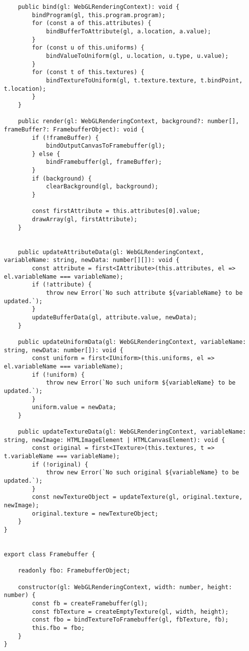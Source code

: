 {\begin{lstlisting}
    public bind(gl: WebGLRenderingContext): void {
        bindProgram(gl, this.program.program);
        for (const a of this.attributes) {
            bindBufferToAttribute(gl, a.location, a.value);
        }
        for (const u of this.uniforms) {
            bindValueToUniform(gl, u.location, u.type, u.value);
        }
        for (const t of this.textures) {
            bindTextureToUniform(gl, t.texture.texture, t.bindPoint, t.location);
        }
    }

    public render(gl: WebGLRenderingContext, background?: number[], frameBuffer?: FramebufferObject): void {
        if (!frameBuffer) {
            bindOutputCanvasToFramebuffer(gl);
        } else {
            bindFramebuffer(gl, frameBuffer);
        }
        if (background) {
            clearBackground(gl, background);
        }

        const firstAttribute = this.attributes[0].value;
        drawArray(gl, firstAttribute);
    }


    public updateAttributeData(gl: WebGLRenderingContext, variableName: string, newData: number[][]): void {
        const attribute = first<IAttribute>(this.attributes, el => el.variableName === variableName);
        if (!attribute) {
            throw new Error(`No such attribute ${variableName} to be updated.`);
        }
        updateBufferData(gl, attribute.value, newData);
    }

    public updateUniformData(gl: WebGLRenderingContext, variableName: string, newData: number[]): void {
        const uniform = first<IUniform>(this.uniforms, el => el.variableName === variableName);
        if (!uniform) {
            throw new Error(`No such uniform ${variableName} to be updated.`);
        }
        uniform.value = newData;
    }

    public updateTextureData(gl: WebGLRenderingContext, variableName: string, newImage: HTMLImageElement | HTMLCanvasElement): void {
        const original = first<ITexture>(this.textures, t => t.variableName === variableName);
        if (!original) {
            throw new Error(`No such original ${variableName} to be updated.`);
        }
        const newTextureObject = updateTexture(gl, original.texture, newImage);
        original.texture = newTextureObject;
    }
}


export class Framebuffer {

    readonly fbo: FramebufferObject;

    constructor(gl: WebGLRenderingContext, width: number, height: number) {
        const fb = createFramebuffer(gl);
        const fbTexture = createEmptyTexture(gl, width, height);
        const fbo = bindTextureToFramebuffer(gl, fbTexture, fb);
        this.fbo = fbo;
    }
}





\end{lstlisting}}
